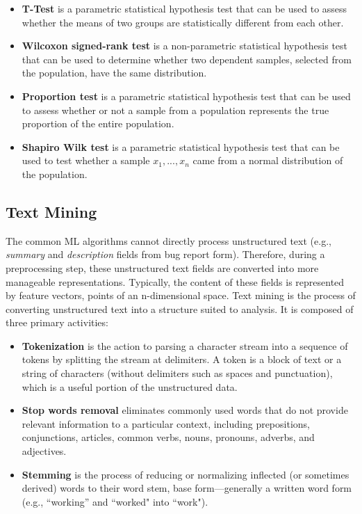 \begin{itemize}
  \item \textbf{T-Test}\cite{Japkowicz:2011} is a parametric statistical hypothesis test that can be used to assess whether the means of two groups are statistically different from each other.
  \item \textbf{Wilcoxon signed-rank test}\cite{Wilcoxon:1992} is a non-parametric statistical hypothesis test that can be used to determine whether two dependent samples, selected from the population, have the same distribution. 
  \item \textbf{Proportion test}\cite{Lewis:2013} is a parametric statistical hypothesis test that can be used to assess whether or not a sample from a population represents the true proportion of the entire population. 
  \item \textbf{Shapiro Wilk test}\cite{Lewis:2013} is a parametric statistical hypothesis test that can be used to test whether a sample $x_1, ..., x_n$ came from a normal distribution of the population.
\end{itemize}


\subsection{Text Mining}
The common ML algorithms cannot directly process unstructured text (e.g., \textit{summary} and \textit{description} fields from bug report form). Therefore, during a preprocessing step, these unstructured text fields are converted into more manageable representations. Typically, the content of these fields is represented by feature vectors, points of an n-dimensional space. Text mining is the process of converting unstructured text into a structure suited to analysis\cite{Feldman:2006}. It is composed of three primary activities\cite{Williams:2011}:

\begin{itemize}
  \item \textbf{Tokenization} is the action to parsing a character stream into a sequence of tokens by splitting the stream at delimiters. A token is a block of text or a string of characters (without delimiters such as spaces and punctuation), which is a useful portion of the unstructured data. 
  \item \textbf{Stop words removal} eliminates commonly used words that do not provide relevant information to a particular context, including prepositions, conjunctions, articles, common verbs, nouns, pronouns, adverbs, and adjectives. 
  \item \textbf{Stemming} is the process of reducing or normalizing inflected (or sometimes derived) words to their word stem, base form—generally a written word form (e.g., ``working” and ``worked" into ``work").
\end{itemize}

